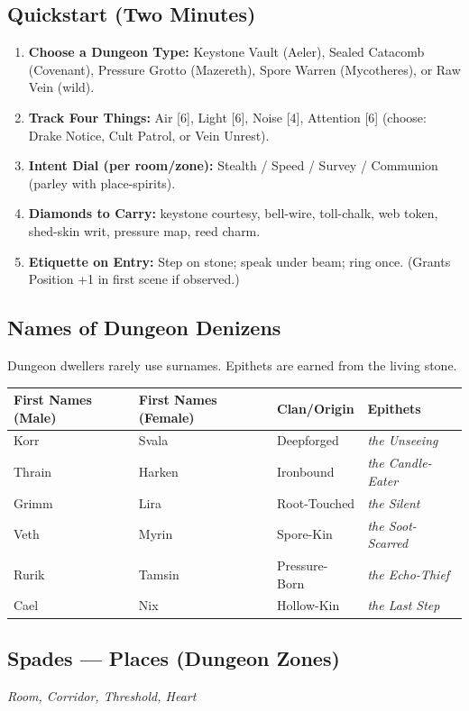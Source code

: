\subsection*{Quickstart (Two Minutes)}
\begin{enumerate}[leftmargin=*]
    \item \textbf{Choose a Dungeon Type:} Keystone Vault (Aeler), Sealed Catacomb (Covenant), Pressure Grotto (Mazereth), Spore Warren (Mycotheres), or Raw Vein (wild).
    \item \textbf{Track Four Things:} Air [6], Light [6], Noise [4], Attention [6] (choose: Drake Notice, Cult Patrol, or Vein Unrest).
    \item \textbf{Intent Dial (per room/zone):} Stealth / Speed / Survey / Communion (parley with place-spirits).
    \item \textbf{Diamonds to Carry:} keystone courtesy, bell-wire, toll-chalk, web token, shed-skin writ, pressure map, reed charm.
    \item \textbf{Etiquette on Entry:} Step on stone; speak under beam; ring once. (Grants Position +1 in first scene if observed.)
\end{enumerate}

\subsection*{Names of Dungeon Denizens}
Dungeon dwellers rarely use surnames. Epithets are earned from the living stone.

\begin{longtable}{|p{}|p{}|p{}|p{}|}
\hline
\textbf{First Names (Male)} & \textbf{First Names (Female)} & \textbf{Clan/Origin} & \textbf{Epithets} \\
\hline
Korr & Svala & Deepforged & \textit{the Unseeing} \\
\hline
Thrain & Harken & Ironbound & \textit{the Candle-Eater} \\
\hline
Grimm & Lira & Root-Touched & \textit{the Silent} \\
\hline
Veth & Myrin & Spore-Kin & \textit{the Soot-Scarred} \\
\hline
Rurik & Tamsin & Pressure-Born & \textit{the Echo-Thief} \\
\hline
Cael & Nix & Hollow-Kin & \textit{the Last Step} \\
\hline
\end{longtable}

\subsection*{Spades --- Places (Dungeon Zones)}
\noindent\textit{Room, Corridor, Threshold, Heart}

